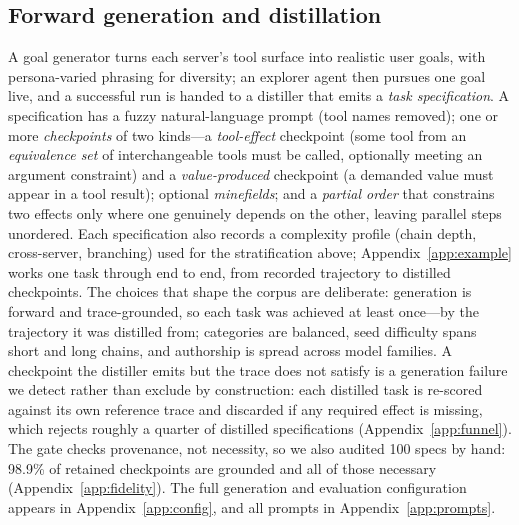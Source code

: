 \subsection{Forward generation and distillation}
\label{sec:benchmark:gen}
A goal generator turns each server's tool surface into realistic user goals,
with persona-varied phrasing for diversity; an explorer agent then pursues
one goal live, and a successful run is handed to a distiller that emits a
\emph{task specification}. A specification has a fuzzy natural-language
prompt (tool names removed); one or more \emph{checkpoints} of two kinds---a
\emph{tool-effect} checkpoint (some tool from an \emph{equivalence set} of
interchangeable tools must be called, optionally meeting an argument
constraint) and a \emph{value-produced} checkpoint (a demanded value must
appear in a tool result); optional \emph{minefields}; and a \emph{partial
order} that constrains two effects only where one genuinely depends on the
other, leaving parallel steps unordered. Each specification also records a
complexity profile (chain depth, cross-server, branching) used for the
stratification above; Appendix~\ref{app:example} works one task through end to
end, from recorded trajectory to distilled checkpoints. The choices that shape
the corpus are deliberate: generation is forward and trace-grounded, so each
task was achieved at least once---by the trajectory it was distilled from;
categories are balanced, seed difficulty spans short and long chains, and
authorship is spread across model families. A checkpoint the distiller emits
but the trace does not
satisfy is a generation failure we detect rather than exclude by construction:
each distilled task is re-scored against its own reference trace and discarded
if any required effect is missing, which rejects roughly a quarter of distilled
specifications (Appendix~\ref{app:funnel}). The gate checks provenance, not
necessity, so we also audited 100 specs by hand: 98.9\% of retained checkpoints
are grounded and all of those necessary (Appendix~\ref{app:fidelity}). The full generation and evaluation configuration appears in
Appendix~\ref{app:config}, and all prompts in Appendix~\ref{app:prompts}.

